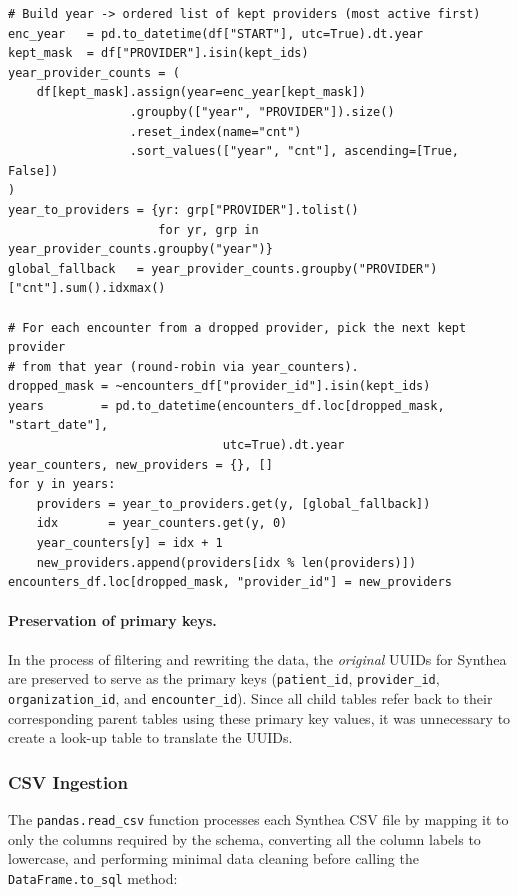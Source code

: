 \begin{lstlisting}[style=pythonstyle]
# Build year -> ordered list of kept providers (most active first)
enc_year   = pd.to_datetime(df["START"], utc=True).dt.year
kept_mask  = df["PROVIDER"].isin(kept_ids)
year_provider_counts = (
    df[kept_mask].assign(year=enc_year[kept_mask])
                 .groupby(["year", "PROVIDER"]).size()
                 .reset_index(name="cnt")
                 .sort_values(["year", "cnt"], ascending=[True, False])
)
year_to_providers = {yr: grp["PROVIDER"].tolist()
                     for yr, grp in year_provider_counts.groupby("year")}
global_fallback   = year_provider_counts.groupby("PROVIDER")["cnt"].sum().idxmax()

# For each encounter from a dropped provider, pick the next kept provider
# from that year (round-robin via year_counters).
dropped_mask = ~encounters_df["provider_id"].isin(kept_ids)
years        = pd.to_datetime(encounters_df.loc[dropped_mask, "start_date"],
                              utc=True).dt.year
year_counters, new_providers = {}, []
for y in years:
    providers = year_to_providers.get(y, [global_fallback])
    idx       = year_counters.get(y, 0)
    year_counters[y] = idx + 1
    new_providers.append(providers[idx % len(providers)])
encounters_df.loc[dropped_mask, "provider_id"] = new_providers
\end{lstlisting}

\paragraph{Preservation of primary keys.} In the process of filtering and rewriting the data, the \emph{original} UUIDs for Synthea are preserved to serve as the primary keys (\texttt{patient\_id}, \texttt{provider\_id}, \texttt{organization\_id}, and \texttt{encounter\_id}). Since all child tables refer back to their corresponding parent tables using these primary key values, it was unnecessary to create a look-up table to translate the UUIDs.

\subsubsection*{CSV Ingestion}

The \texttt{pandas.read\_csv} function processes each Synthea CSV file by mapping it to only the columns required by the schema, converting all the column labels to lowercase, and performing minimal data cleaning before calling the \texttt{DataFrame.to\_sql} method:

